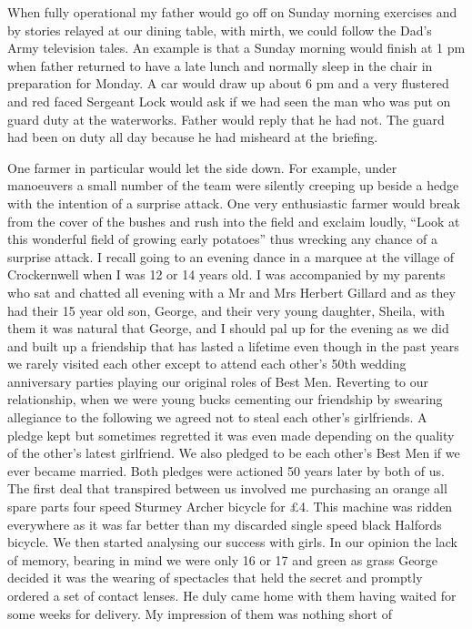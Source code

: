 When fully operational my father would go off on Sunday morning exercises and by
stories relayed at our dining table, with mirth, we could follow the Dad's Army
television tales. An example is that a Sunday morning would finish at 1 pm
when father returned to have a late lunch and normally sleep in the chair in
preparation for Monday. A car would draw up about 6 pm and a very flustered
and red faced Sergeant Lock would ask if we had seen the man who was put on
guard duty at the waterworks. Father would reply that he had not. The guard
had been on duty all day because he had misheard at the briefing.

One farmer in particular would let the side down. For example, under manoeuvers
a small number of the team were silently creeping up beside a hedge with the
intention of a surprise attack. One very enthusiastic farmer would break from
the cover of the bushes and rush into the field and exclaim loudly, ``Look at
this wonderful field of growing early potatoes'' thus wrecking any chance of a
surprise attack. I recall going to an evening dance in a marquee at the village
of Crockernwell when I was 12 or 14 years old. I was accompanied by my parents
who sat and chatted all evening with a Mr and Mrs Herbert Gillard and as they
had their 15 year old son, George, and their very young daughter, Sheila, with
them it was natural that George, and I should pal up for the evening as we did
and built up a friendship that has lasted a lifetime even though in the past
years we rarely visited each other except to attend each other's 50th wedding
anniversary parties playing our original roles of Best Men. Reverting to our
relationship, when we were young bucks cementing our friendship by swearing
allegiance to the following we agreed not to steal each other's girlfriends. A
pledge kept but sometimes regretted it was even made depending on the quality
of the other's latest girlfriend. We also pledged to be each other's Best Men
if we ever became married. Both pledges were actioned 50 years later by both
of us. The first deal that transpired between us involved me purchasing an
orange all spare parts four speed Sturmey Archer bicycle for £4. This machine
was ridden everywhere as it was far better than my discarded single speed black
Halfords bicycle. We then started analysing our success with girls. In our
opinion the lack of memory, bearing in mind we were only 16 or 17 and green as
grass George decided it was the wearing of spectacles that held the secret and
promptly ordered a set of contact lenses. He duly came home with them having
waited for some weeks for delivery. My impression of them was nothing short of
